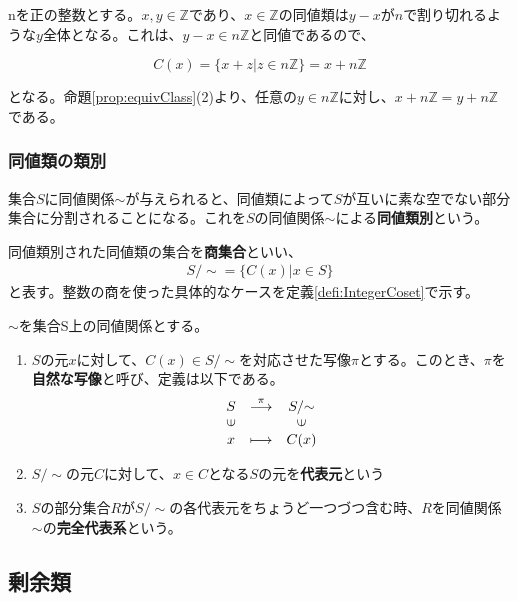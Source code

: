 \documentclass[dvipdfmx,autodetect-engine]{jsarticle}
\begin{document}
\exam nを正の整数とする。$x, y \in \mathbb{Z}$であり、$x \in \mathbb{Z}$の同値類は$y - x$が$n$で割り切れるような$y$全体となる。これは、$y - x \in n\mathbb{Z}$と同値であるので、

$$
C(x) = \{x + z | z \in n\mathbb{Z}\} = x + n\mathbb{Z}
$$

となる。命題\ref{prop:equivClass}(2)より、任意の$y \in n\mathbb{Z}$に対し、$x + n\mathbb{Z} = y + n\mathbb{Z}$である。

\subsubsection{同値類の類別}
集合$S$に同値関係$\sim$が与えられると、同値類によって$S$が互いに素な空でない部分集合に分割されることになる。これを$S$の同値関係$\sim$による{\bf 同値類別}という。

\label{defi:quotientSet}

同値類別された同値類の集合を{\bf 商集合}といい、
\begin{eqnarray*}
S/{\sim}  = \{C(x)| x ∈ S\}
\end{eqnarray*}
と表す。整数の商を使った具体的なケースを定義\ref{defi:IntegerCoset}で示す。

 $\sim$を集合S上の同値関係とする。
\begin{enumerate}
\renewcommand{\labelenumi}{(\arabic{enumi})}
\item $S$の元$x$に対して、$C(x) \in S/{\sim}$を対応させた写像$\pi$とする。このとき、$\pi$を{\bf 自然な写像}と呼び、定義は以下である。
$$
\begin{array}{ccc}
S & \stackrel{\pi}{\longrightarrow} & S/{\sim} \\
\rotatebox{90}{$\in$} & & \rotatebox{90}{$\in$} \\
x & \longmapsto & C(x)
\end{array}
$$

\item $S/{\sim}$の元$C$に対して、$x \in C$となる$S$の元を{\bf 代表元}という

\item $S$の部分集合$R$が$S/{\sim}$の各代表元をちょうど一つづつ含む時、$R$を同値関係$\sim$の{\bf 完全代表系}という。

\end{enumerate}

\subsection{剰余類}
\end{document}
